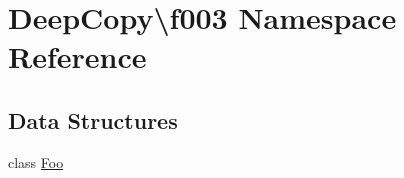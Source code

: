 \hypertarget{namespace_deep_copy_1_1f003}{}\section{Deep\+Copy\textbackslash{}f003 Namespace Reference}
\label{namespace_deep_copy_1_1f003}
\subsection*{Data Structures}
\begin{DoxyCompactItemize}
\item 
class \mbox{\hyperlink{class_deep_copy_1_1f003_1_1_foo}{Foo}}
\end{DoxyCompactItemize}

